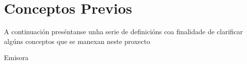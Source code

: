\chapter[Conceptos Previos]{
  \label{chp:conceptos}
  Conceptos Previos
}
\minitoc
\newpage

A continuación preséntanse unha serie de definicións coa finalidade de clarificar
algúns conceptos que se manexan neste proxecto


\begin{description}

\item[Emisora] 




\end{description}


